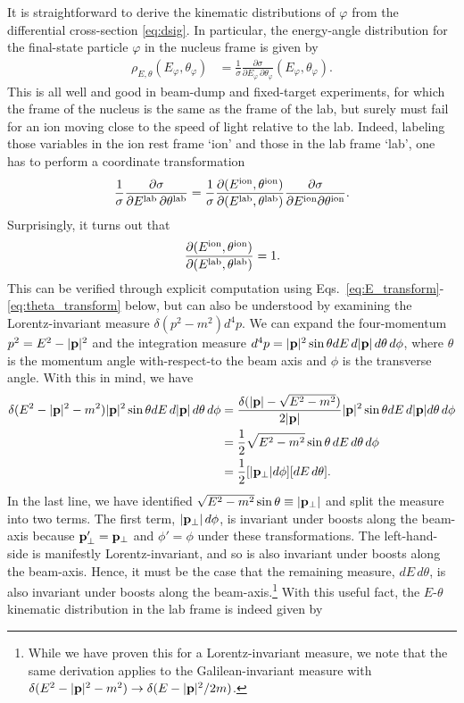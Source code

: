 It is straightforward to derive the kinematic distributions of $\varphi$ from the differential cross-section \ref{eq:dsig}. In particular, the energy-angle distribution for the final-state particle $\varphi$ in the nucleus frame is given by 
\begin{align}
    \rho_{E,\theta}(E_\varphi, \theta_\varphi) &= \frac{1}{\sigma}\frac{\partial \sigma}{\partial E_\varphi \,\partial\theta_\varphi}(E_\varphi, \theta_\varphi). \label{eq:phi_dist}
\end{align}
This is all well and good in beam-dump and fixed-target experiments, for which the frame of the nucleus is the same as the frame of the lab, but surely must fail for an ion moving close to the speed of light relative to the lab. Indeed, labeling those variables in the ion rest frame `ion' and those in the lab frame `lab', one has to perform a coordinate transformation 
\begin{align}
    \frac{1}{\sigma}\frac{\partial \sigma}{\partial E^{\rm lab}\,\partial \theta^{\rm lab}} = \frac{1}{\sigma}\frac{\partial(E^{\rm ion}, \theta^{\rm ion})}{\partial(E^{\rm lab}, \theta^{\rm lab})}\frac{\partial \sigma}{\partial E^{\rm ion} \partial\theta^{\rm ion}}.
\end{align}
Surprisingly, it turns out that 
\begin{align}
    \frac{\partial(E^{\rm ion}, \theta^{\rm ion})}{\partial(E^{\rm lab}, \theta^{\rm lab})} = 1.
\end{align}
This can be verified through explicit computation using Eqs.~\ref{eq:E_transform}-\ref{eq:theta_transform} below, but can also be understood by examining the Lorentz-invariant measure $\delta(p^2 - m^2)d^4p$. We can expand the four-momentum $p^2 = E^2 - |{\bf p}|^2$ and the integration measure $d^4p = |{\bf p}|^2\sin{\theta}dE\,d|{\bf p}|\,d\theta\,d\phi$, where $\theta$ is the momentum angle with-respect-to the beam axis and $\phi$ is the transverse angle. With this in mind, we have
\begin{align}
    \delta(E^2-|{\bf p}|^2 - m^2)|{\bf p}|^2\sin{\theta}dE\,d|{\bf p}|\,d\theta\,d\phi &= \frac{\delta(|{\bf p}| - \sqrt{E^2 - m^2})}{2|{\bf p}|}|{\bf p}|^2 \sin{\theta}dE\,d|{\bf p}|d\theta\,d\phi\nonumber\\
    &= \frac{1}{2}\sqrt{E^2 - m^2}\sin{\theta}\,dE\,d\theta\,d\phi\nonumber\\
    &= \frac{1}{2}[|{\bf p}_{\perp}|d\phi][dE\,d\theta].
\end{align}
In the last line, we have identified $\sqrt{E^2 - m^2}\sin{\theta}\equiv |{\bf p}_\perp|$ and split the measure into two terms. The first term, $|{\bf p}_\perp|\,d\phi$, is invariant under boosts along the beam-axis because $ {\bf p}_\perp' = {\bf p}_\perp$ and $\phi'=\phi$ under these transformations. The left-hand-side is manifestly Lorentz-invariant, and so is also invariant under boosts along the beam-axis. Hence, it must be the case that the remaining measure, $dE\,d\theta$, is also invariant under boosts along the beam-axis.\footnote{While we have proven this for a Lorentz-invariant measure, we note that the same derivation applies to the Galilean-invariant measure with $\delta(E^2 - |{\bf p}|^2 - m^2) \rightarrow \delta(E - |{\bf p}|^2/2m)$.} With this useful fact, the $E$-$\theta$ kinematic distribution in the lab frame is indeed given by
